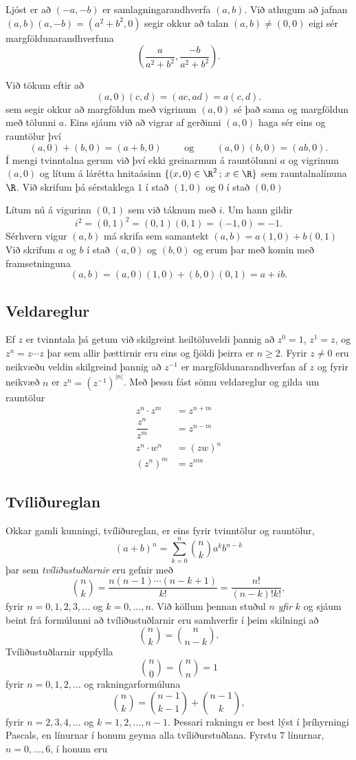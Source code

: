 Ljóst er að $(-a,-b)$ er samlagningarandhverfa $(a,b)$.  Við athugum að
jafnan $(a,b)(a,-b)=(a^2+b^2,0)$ segir okkur að talan
$(a,b)\neq (0,0)$ eigi sér margföldunarandhverfuna
$$(\dfrac a{a^2+b^2},\dfrac{-b}{a^2+b^2}).
$$  

Við tökum eftir  að 
$$
(a,0)(c,d)=(ac,ad)=a(c,d).
$$
sem segir okkur að margföldun með
vigrinum $(a,0)$ sé það sama og margföldun með tölunni $a$.
Eins sjáum við að vigrar af gerðinni $(a,0)$ haga sér eins 
og rauntölur því 
$$
(a,0)+(b,0)=(a+b,0) \qquad \text{ og } \qquad 
(a,0)(b,0)=(ab,0).
$$
Í mengi tvinntalna gerum við því ekki greinarmun á rauntölunni $a$ og
vigrinum $(a,0)$ og lítum á lárétta hnitaásinn
$\{(x,0)\in\R^2\,;\, x\in \R\}$ sem rauntalnalínuna $\R$.
Við skrifum þá sérstaklega $1$ í stað $(1,0)$ og $0$ í stað 
$(0,0)$

Lítum nú á vigurinn $(0,1)$ sem við táknum með $i$.  
Um hann gildir 
$$
i^2=(0,1)^2=(0,1)(0,1)=(-1,0)=-1.
$$
Sérhvern vigur $(a,b)$ má skrifa sem samantekt $(a,b)=a(1,0)+b(0,1)$
Við skrifum $a$ og $b$ í stað $(a,0)$ og $(b,0)$ og erum þar með
komin með framsetninguna
$$
(a,b)=(a,0)(1,0)+(b,0)(0,1)=a+ib.
$$ 


\subsection*{Veldareglur}

Ef $z$ er tvinntala þá getum við skilgreint heiltöluveldi þannig
að $z^0=1$, $z^1=z$, og $z^n=z\cdots z$ þar sem allir þættirnir eru
eins og fjöldi þeirra er $n\geq 2$.  Fyrir $z\neq 0$ eru
neikvæðu veldin skilgreind
þannig að $z^{-1}$ er margföldunarandhverfan af $z$ og fyrir neikvæð 
$n$ er $z^n=(z^{-1})^{|n|}$.  Með þessu fást sömu veldareglur og gilda
um rauntölur  
\begin{align*}
z^n\cdot z^m&=z^{n+m}\\
\dfrac {z^n}{z^m}&=z^{n-m}\\
z^n\cdot w^n&=(zw)^n\\
(z^n)^m&=z^{nm}
\end{align*}

\subsection*{Tvíliðureglan}


Okkar gamli kunningi, tvíliðureglan, er eins fyrir tvinntölur og
rauntölur,
$$
(a+b)^n=\sum_{k=0}^n\binom nk a^kb^{n-k}
$$
þar sem {\it tvíliðustuðlarnir} eru gefnir með 
$$
\binom nk=\dfrac{n(n-1)\cdots(n-k+1)}{k!}=\dfrac{n!}{(n-k)!k!},
$$
fyrir $n=0,1,2,3,\dots$ og $k=0,\dots,n$.   Við köllum þennan stuðul
$n$ {\it yfir} $k$ og sjáum beint frá formúlunni að tvíliðustuðlarnir
 eru samhverfir í þeim skilningi að
$$
\binom nk=\binom n{n-k}.
$$
Tvíliðustuðlarnir uppfylla 
$$
\binom n0=\binom nn=1
$$
fyrir $n=0,1,2,\dots$ og rakningarformúluna
$$
\binom nk=\binom{n-1}{k-1}+\binom{n-1}k, 
$$
fyrir $n=2,3,4,\dots$ og $k=1,2,\dots,n-1$.
Þessari rakningu er best lýst í  þríhyrningi Pascals, en línurnar í
honum geyma alla tvíliðurstuðlana.  Fyrstu $7$ línurnar, 
$n=0,\dots,6$, í honum eru

